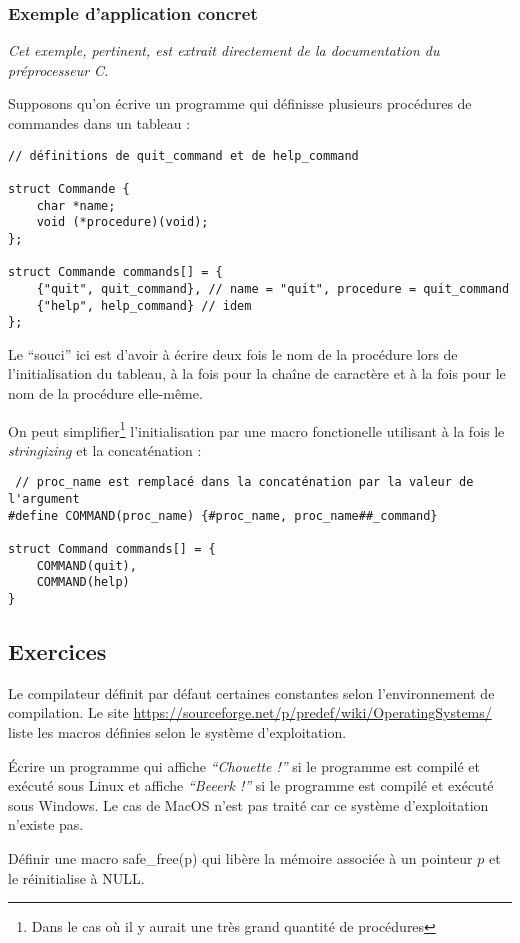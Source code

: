 \documentclass[../../../main.tex]{subfiles}
\begin{document}
\subsubsection{Exemple d'application concret}
\textit{Cet exemple, pertinent, est extrait directement de la documentation du préprocesseur C.}

Supposons qu'on écrive un programme qui définisse plusieurs procédures de commandes dans un tableau :
\begin{verbatim}
// définitions de quit_command et de help_command

struct Commande {
	char *name;
	void (*procedure)(void);
};

struct Commande commands[] = {
	{"quit", quit_command}, // name = "quit", procedure = quit_command
	{"help", help_command} // idem
};
\end{verbatim}
Le ``souci'' ici est d'avoir à écrire deux fois le nom de la procédure lors de l'initialisation du tableau, à la fois pour la chaîne de caractère et à la fois pour le nom de la procédure elle-même.

On peut simplifier\footnote{Dans le cas où il y aurait une très grand quantité de procédures} l'initialisation par une macro fonctionelle utilisant à la fois le \textit{stringizing} et la concaténation :
\begin{verbatim}
 // proc_name est remplacé dans la concaténation par la valeur de l'argument
#define COMMAND(proc_name) {#proc_name, proc_name##_command}

struct Command commands[] = {
	COMMAND(quit),
	COMMAND(help)
}
\end{verbatim}
\subsection{Exercices}
Le compilateur définit par défaut certaines constantes selon l'environnement de compilation. Le site \url{https://sourceforge.net/p/predef/wiki/OperatingSystems/} liste les macros définies selon le système d'exploitation.

Écrire un programme qui affiche \textit{``Chouette !''} si le programme est compilé et exécuté sous Linux et affiche \textit{``Beeerk !''} si le programme est compilé et exécuté sous Windows. Le cas de MacOS n'est pas traité car ce système d'exploitation n'existe pas.

Définir une macro \textsf{safe\_free(p)} qui libère la mémoire associée à un pointeur $p$ et le réinitialise à \textsf{NULL}.
\end{document}
